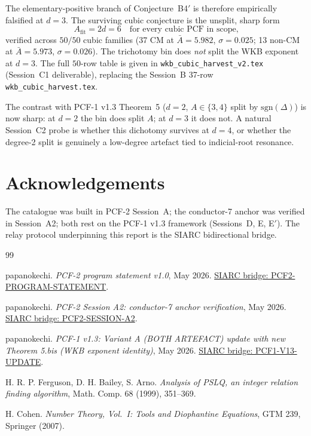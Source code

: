 \documentclass[11pt,reqno]{amsart}
\theoremstyle{definition}
\begin{document}
The elementary-positive branch of Conjecture~B4$'$ is therefore
empirically falsified at $d = 3$. The surviving cubic conjecture is
the unsplit, sharp form
\[
   A_{\mathrm{fit}} = 2d = 6 \quad\text{for every cubic PCF in scope,}
\]
verified across $50/50$ cubic families (37 CM at $\bar{A} = 5.982$,
$\sigma = 0.025$; 13 non-CM at $\bar{A} = 5.973$, $\sigma = 0.026$).
The trichotomy bin does \emph{not} split the WKB exponent at $d = 3$.
The full $50$-row table is given in
\texttt{wkb\_cubic\_harvest\_v2.tex} (Session~C1 deliverable),
replacing the Session~B 37-row \texttt{wkb\_cubic\_harvest.tex}.

The contrast with PCF-1 v1.3 Theorem~5 ($d = 2$, $A \in \{3, 4\}$
split by $\mathrm{sgn}(\Delta)$) is now sharp: at $d = 2$ the bin
does split $A$; at $d = 3$ it does not. A natural Session~C2 probe
is whether this dichotomy survives at $d = 4$, or whether the
degree-2 split is genuinely a low-degree artefact tied to indicial-root
resonance.

\section*{Acknowledgements}

The catalogue was built in PCF-2 Session~A; the conductor-7 anchor was
verified in Session~A2; both rest on the PCF-1 v1.3 framework
(Sessions~D, E, E$'$). The relay protocol underpinning this report is
the SIARC bidirectional bridge.


\begin{thebibliography}{99}

 papanokechi.
\emph{PCF-2 program statement v1.0}, May 2026.
\href{https://github.com/papanokechi/siarc-relay-bridge/tree/main/sessions/2026-05-01/PCF2-PROGRAM-STATEMENT/}
{SIARC bridge: PCF2-PROGRAM-STATEMENT}.

 papanokechi.
\emph{PCF-2 Session A2: conductor-7 anchor verification}, May 2026.
\href{https://github.com/papanokechi/siarc-relay-bridge/tree/main/sessions/2026-05-01/PCF2-SESSION-A2/}
{SIARC bridge: PCF2-SESSION-A2}.

 papanokechi.
\emph{PCF-1 v1.3: Variant A (BOTH ARTEFACT) update with new Theorem 5.bis
(WKB exponent identity)}, May 2026.
\href{https://github.com/papanokechi/siarc-relay-bridge/tree/main/sessions/2026-05-01/PCF1-V13-UPDATE/}
{SIARC bridge: PCF1-V13-UPDATE}.

 H. R. P. Ferguson, D. H. Bailey, S. Arno.
\emph{Analysis of PSLQ, an integer relation finding algorithm},
Math. Comp. 68 (1999), 351--369.

 H. Cohen.
\emph{Number Theory, Vol.~I: Tools and Diophantine Equations},
GTM 239, Springer (2007).
\end{thebibliography}
\end{document}
